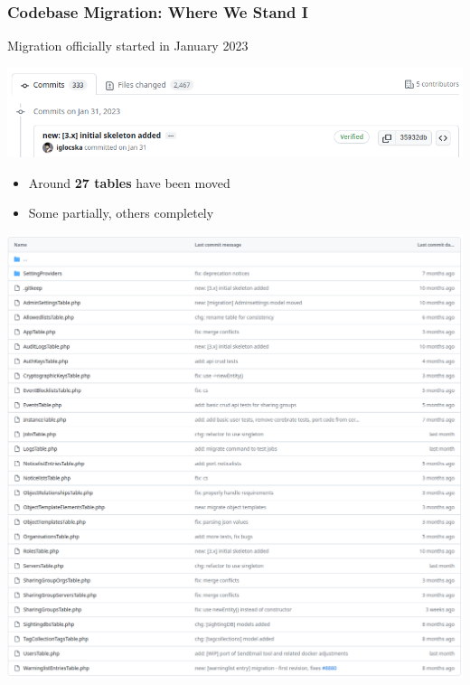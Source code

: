 \begin{frame}
    \frametitle{Codebase Migration: Where We Stand I}
    Migration officially started in January 2023
    \begin{center}
        \includegraphics[width=1\linewidth]{pictures/status-2023-10-03.png}
    \end{center}
    \begin{minipage}{0.62\textwidth}
        \begin{itemize}
            \item Around \textbf{27 tables} have been moved
            \item Some partially, others completely
        \end{itemize}
    \end{minipage}%
    \begin{minipage}{0.33\textwidth}
        \;\includegraphics[width=1.2\linewidth]{pictures/migrated-models.png}
    \end{minipage}
    
\end{frame}

